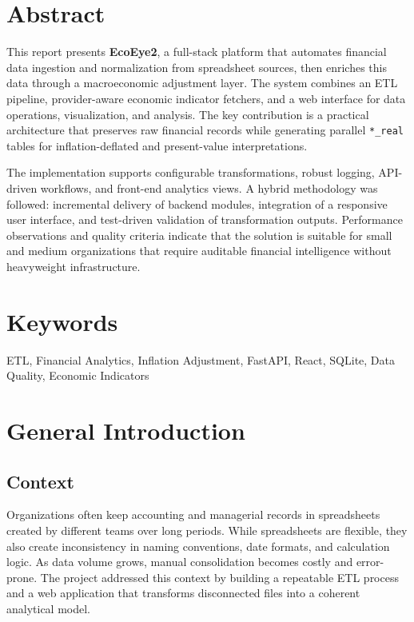\documentclass[12pt,a4paper]{report}
\begin{document}
\chapter*{Abstract}
This report presents \textbf{EcoEye2}, a full-stack platform that automates financial data ingestion and normalization from spreadsheet sources, then enriches this data through a macroeconomic adjustment layer. The system combines an ETL pipeline, provider-aware economic indicator fetchers, and a web interface for data operations, visualization, and analysis. The key contribution is a practical architecture that preserves raw financial records while generating parallel \texttt{*\_real} tables for inflation-deflated and present-value interpretations.

The implementation supports configurable transformations, robust logging, API-driven workflows, and front-end analytics views. A hybrid methodology was followed: incremental delivery of backend modules, integration of a responsive user interface, and test-driven validation of transformation outputs. Performance observations and quality criteria indicate that the solution is suitable for small and medium organizations that require auditable financial intelligence without heavyweight infrastructure.

\chapter*{Keywords}
ETL, Financial Analytics, Inflation Adjustment, FastAPI, React, SQLite, Data Quality, Economic Indicators

\tableofcontents
\listoffigures
\listoftables

\clearpage
{}

\chapter{General Introduction}
\section{Context}
Organizations often keep accounting and managerial records in spreadsheets created by different teams over long periods. While spreadsheets are flexible, they also create inconsistency in naming conventions, date formats, and calculation logic. As data volume grows, manual consolidation becomes costly and error-prone. The project addressed this context by building a repeatable ETL process and a web application that transforms disconnected files into a coherent analytical model.
\end{document}
